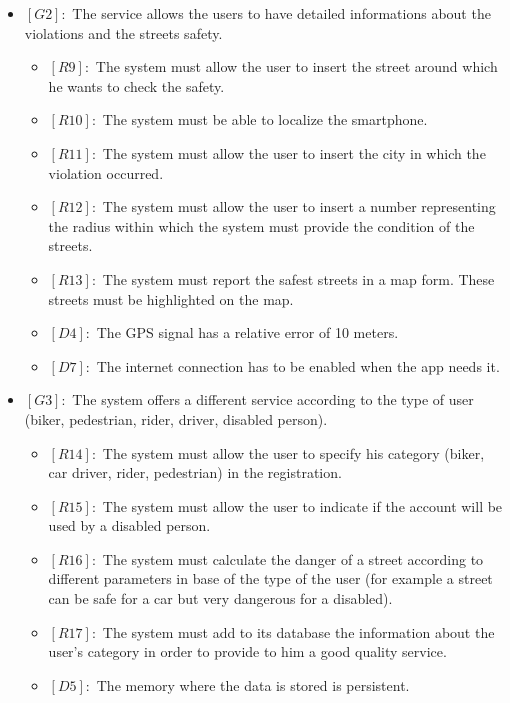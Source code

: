 \documentclass[titlepage]{article}
\begin{document}
\begin{itemize}
\begin{itemize}
 \end{itemize}
 \item $[G2]:$ The service allows the users to have detailed informations about the violations and the streets safety.
 \begin{itemize}
 	\item $[R9]:$ The system must allow the user to insert the street around which he wants to check the safety.
 	\item $[R10]:$ The system must be able to localize the smartphone.
 	\item $[R11]:$ The system must allow the user to insert the city in which the violation occurred.
 	\item $[R12]:$ The system must allow the user to insert a number representing the radius within which the system must provide the condition of the streets.
 	\item $[R13]:$ The system must report the  safest streets in a map form. These streets must be highlighted on the map.
 	\item $[D4]:$ The GPS signal has a relative error of 10 meters.
 	\item $[D7]:$ The internet connection has to be enabled when the app needs it.
 \end{itemize}
 
 \item $[G3]:$ The system offers a different service according to the type of user (biker, pedestrian, rider, driver, disabled person).
 \begin{itemize}
 \item $[R14]:$ The system must allow the user to specify his category (biker, car driver, rider, pedestrian) in the registration.
 \item $[R15]:$ The system must allow the user to indicate if the account will be used by a disabled person.
 \item $[R16]:$ The system must calculate the danger of a street according to different parameters in base of the type of the user (for example a street can be safe for a car but very dangerous for a disabled).
 \item $[R17]:$ The system must add to its database the information about the user's category in order to provide to him a good quality service.
 \item $[D5]:$ The memory where the data is stored is persistent.
 \end{itemize}
 

\end{itemize}
\end{document}
